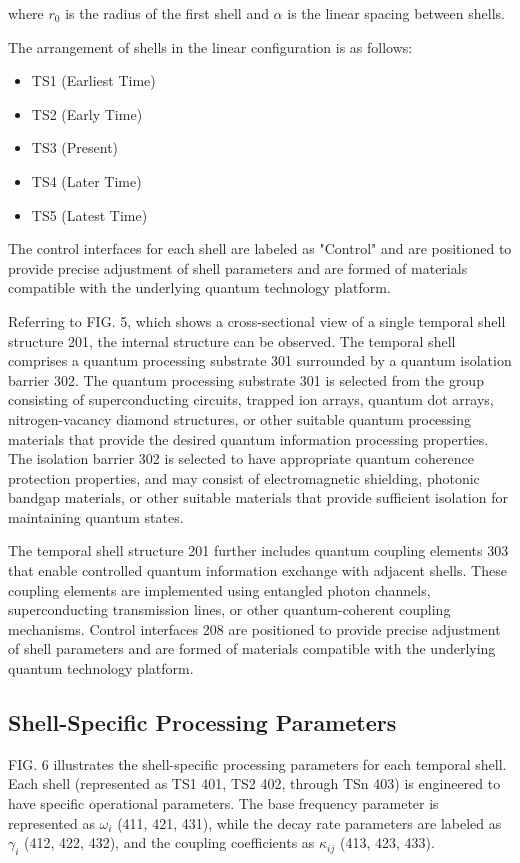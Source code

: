 \documentclass[12pt,letterpaper]{article}
\begin{document}
where $r_0$ is the radius of the first shell and $\alpha$ is the linear spacing between shells.

The arrangement of shells in the linear configuration is as follows:
\begin{itemize}
    \item TS1 (Earliest Time)
    \item TS2 (Early Time)
    \item TS3 (Present)
    \item TS4 (Later Time)
    \item TS5 (Latest Time)
\end{itemize}

The control interfaces for each shell are labeled as "Control" and are positioned to provide precise adjustment of shell parameters and are formed of materials compatible with the underlying quantum technology platform.

Referring to FIG. 5, which shows a cross-sectional view of a single temporal shell structure 201, the internal structure can be observed. The temporal shell comprises a quantum processing substrate 301 surrounded by a quantum isolation barrier 302. The quantum processing substrate 301 is selected from the group consisting of superconducting circuits, trapped ion arrays, quantum dot arrays, nitrogen-vacancy diamond structures, or other suitable quantum processing materials that provide the desired quantum information processing properties. The isolation barrier 302 is selected to have appropriate quantum coherence protection properties, and may consist of electromagnetic shielding, photonic bandgap materials, or other suitable materials that provide sufficient isolation for maintaining quantum states.

The temporal shell structure 201 further includes quantum coupling elements 303 that enable controlled quantum information exchange with adjacent shells. These coupling elements are implemented using entangled photon channels, superconducting transmission lines, or other quantum-coherent coupling mechanisms. Control interfaces 208 are positioned to provide precise adjustment of shell parameters and are formed of materials compatible with the underlying quantum technology platform.

\subsection{Shell-Specific Processing Parameters}

FIG. 6 illustrates the shell-specific processing parameters for each temporal shell. Each shell (represented as TS1 401, TS2 402, through TSn 403) is engineered to have specific operational parameters. The base frequency parameter is represented as $\omega_i$ (411, 421, 431), while the decay rate parameters are labeled as $\gamma_i$ (412, 422, 432), and the coupling coefficients as $\kappa_{ij}$ (413, 423, 433).
\end{document}
